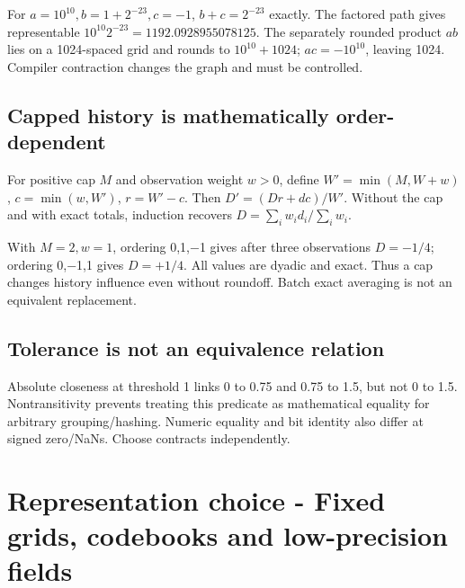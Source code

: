 For \(a=10^{10},b=1+2^{-23},c=-1\), \(b+c=2^{-23}\) exactly. The factored path gives representable \(10^{10}2^{-23}=1192.0928955078125\). The separately rounded product \(ab\) lies on a 1024-spaced grid and rounds to \(10^{10}+1024\); \(ac=-10^{10}\), leaving 1024. Compiler contraction changes the graph and must be controlled.

\subsection{Capped history is mathematically order-dependent}\label{03-visual-computing-i-ch018-capped-history-is-mathematically-order-dependent}

\hypertarget{03-visual-computing-i-ch018-capped-history-is-mathematically-order-dependent}{}

For positive cap \(M\) and observation weight \(w>0\), define \(W'=\min(M,W+w)\), \(c=\min(w,W')\), \(r=W'-c\). Then \(D'=(Dr+dc)/W'\). Without the cap and with exact totals, induction recovers \(D=\sum_iw_id_i/\sum_iw_i\).

With \(M=2,w=1\), ordering 0,1,−1 gives after three observations \(D=-1/4\); ordering 0,−1,1 gives \(D=+1/4\). All values are dyadic and exact. Thus a cap changes history influence even without roundoff. Batch exact averaging is not an equivalent replacement.

\subsection{Tolerance is not an equivalence relation}\label{03-visual-computing-i-ch018-tolerance-is-not-an-equivalence-relation}

\hypertarget{03-visual-computing-i-ch018-tolerance-is-not-an-equivalence-relation}{}

Absolute closeness at threshold 1 links 0 to 0.75 and 0.75 to 1.5, but not 0 to 1.5. Nontransitivity prevents treating this predicate as mathematical equality for arbitrary grouping/hashing. Numeric equality and bit identity also differ at signed zero/NaNs. Choose contracts independently.

\section{Representation choice - Fixed grids, codebooks and low-precision fields}\label{03-visual-computing-i-ch018-representation-choice---fixed-grids-codebooks-and-low-precision-fields}

\hypertarget{03-visual-computing-i-ch018-representation-choice---fixed-grids-codebooks-and-low-precision-fields}{}

